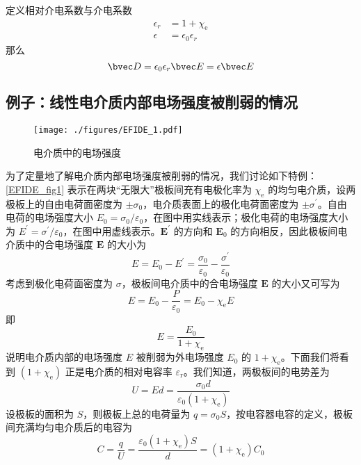 定义相对介电系数与介电系数
\begin{align}
\epsilon_r &= 1+\chi_{\mathrm e}\\
\epsilon &= \epsilon_0 \epsilon_r
\end{align}
那么
\begin{equation}
\bvec D = \epsilon_0 \epsilon_r \bvec E = \epsilon \bvec E 
\end{equation}

\subsection{例子：线性电介质内部电场强度被削弱的情况}
\begin{figure}[ht]
\centering
\texttt{[image: ./figures/EFIDE\_1.pdf]}
\caption{电介质中的电场强度} \label{EFIDE_fig1}
\end{figure}
为了定量地了解电介质内部电场强度被削弱的情况，我们讨论如下特例：\autoref{EFIDE_fig1} 表示在两块“无限大”极板间充有电极化率为 $\chi_\mathrm{e}$ 的均匀电介质，设两极板上的自由电荷面密度为 $\pm \sigma_0$，电介质表面上的极化电荷面密度为 $\pm \sigma^\prime$。自由电荷的电场强度大小 $E_{0}=\sigma_{0} / \varepsilon_{0}$，在图中用实线表示；极化电荷的电场强度大小为 $E^{\prime}=\sigma^{\prime} / \varepsilon_{0}$，在图中用虚线表示。$\mathbf E^\prime$ 的方向和 $\mathbf E_0$ 的方向相反，因此极板间电介质中的合电场强度 $\mathbf E $ 的大小为
\begin{equation}
E=E_{0}-E^{\prime}=\frac{\sigma_{0}}{\varepsilon_{0}}-\frac{\sigma^{\prime}}{\varepsilon_{0}}
\end{equation}
考虑到极化电荷面密度为 $\sigma$，极板间电介质中的合电场强度 $\mathbf E $ 的大小又可写为
\begin{equation}
E=E_{0}-\frac{P}{\varepsilon_{0}}=E_{0}-\chi_{\mathrm e} E
\end{equation}
即
\begin{equation} \label{EFIDE_eq1}
E=\frac{E_{0}}{1+\chi_{\mathrm{e}}}
\end{equation}
说明电介质内部的电场强度 $E $ 被削弱为外电场强度 $E_0$ 的 ${1+\chi_{\mathrm{e}}}$。下面我们将看到 $({1+\chi_{\mathrm{e}}})$ 正是电介质的相对电容率 $\varepsilon_\mathrm{r}$。我们知道，两极板间的电势差为
\begin{equation}
U=E d=\frac{\sigma_{0} d}{\varepsilon_{0}\left(1+\chi_{\mathrm e}\right)}
\end{equation}
设极板的面积为 $S$，则极板上总的电荷量为 $q=\sigma_{0} S$，按电容器电容的定义，极板间充满均匀电介质后的电容为
\begin{equation}
C=\frac{q}{U}=\frac{\varepsilon_{0}\left(1+\chi_{\mathrm e}\right) S}{d}=\left(1+\chi_{\mathrm e}\right) C_{0}
\end{equation}
